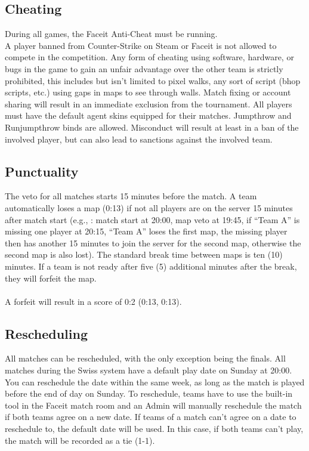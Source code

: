 \documentclass{article}
\begin{document}
\subsection{Cheating}
During all games, the Faceit Anti-Cheat must be running.\\
A player banned from Counter-Strike on Steam or Faceit is not allowed to compete in the competition.
Any form of cheating using software, hardware, or bugs in the game to gain an unfair advantage over the 
other team is strictly prohibited, this includes but isn't limited to pixel walks, any sort of script (bhop scripts, etc.)
using gaps in maps to see through walls. Match fixing or account sharing will result in an immediate exclusion from the tournament.
All players must have the default agent skins equipped for their matches. Jumpthrow and Runjumpthrow binds are allowed.  
Misconduct will result at least in a ban of the involved player, but can also lead to sanctions against the involved team.\\

\subsection{Punctuality}
The veto for all matches starts 15 minutes before the match. A team automatically loses a map (0:13) if not all players are on the server 15 minutes after match start (e.g., : match start at 20:00, map veto at 19:45, if “Team A” is missing one player at 20:15, “Team A” loses the first map, the missing player then has another 15 minutes to join the server for the second map, otherwise the second map is also lost). The standard break time between maps is ten (10) minutes. If a team is not ready after five (5) additional minutes after the break, they will forfeit the map. \\
\\
A forfeit will result in a score of 0:2 (0:13, 0:13).

\subsection{Rescheduling}
All matches can be rescheduled, with the only exception being the finals. All matches during the Swiss system have a default play date on Sunday at 20:00. You can reschedule the date within the same week, as long as the match is played before the end of day
on Sunday. To reschedule, teams have to use the built-in tool in the Faceit match room and an Admin will manually reschedule the match if both teams agree on a new date. If teams of a match can't agree on a date to reschedule to, the default date will be used. In this case, if both teams can't play, the match will be recorded as a tie (1-1).
\end{document}
